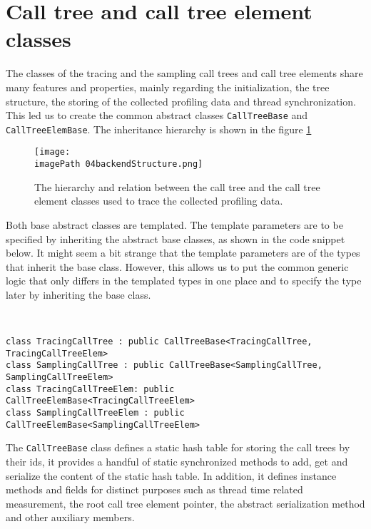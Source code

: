 \section{Call tree and call tree element classes}
The classes of the tracing and the sampling call trees and call tree elements share many features and properties, mainly regarding the initialization, the tree structure, the storing of the collected profiling data and thread synchronization. This led us to create the common abstract classes \texttt{CallTreeBase} and \texttt{CallTreeElemBase}. The inheritance hierarchy is shown in the figure \ref{fig:04backendStructure}


\begin{figure}
	\centering
		\texttt{[image: \\imagePath 04backendStructure.png]}
		\caption{The hierarchy and relation between the call tree and the call tree element classes used to trace the collected profiling data.}
	\label{fig:04backendStructure}
\end{figure}

Both base abstract classes are templated. The template parameters are to be specified by inheriting the abstract base classes, as shown in the code snippet below. It might seem a bit strange that the template parameters are of the types that inherit the base class. However, this allows us to put the common generic logic that only differs in the templated types in one place and to specify the type later by inheriting the base class.

\ 

\begin{lstlisting} 
class TracingCallTree : public CallTreeBase<TracingCallTree, TracingCallTreeElem>
class SamplingCallTree : public CallTreeBase<SamplingCallTree, SamplingCallTreeElem>
class TracingCallTreeElem: public CallTreeElemBase<TracingCallTreeElem>
class SamplingCallTreeElem : public CallTreeElemBase<SamplingCallTreeElem>
\end{lstlisting}

The \texttt{CallTreeBase} class defines a static hash table for storing the call trees by their ids, it provides a handful of static synchronized methods to add, get and serialize the content of the static hash table. In addition, it defines instance methods and fields for distinct purposes such as thread time related measurement, the root call tree element pointer, the abstract serialization method and other auxiliary members.

